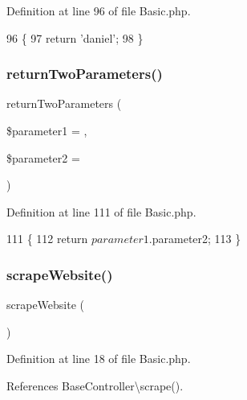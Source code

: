 Definition at line 96 of file Basic.\+php.


\begin{DoxyCode}
96                                    \{
97         \textcolor{keywordflow}{return} \textcolor{stringliteral}{'daniel'};
98     \}
\end{DoxyCode}
\hypertarget{class_basic_a2ef87b96abcca966a41e34d077fcc38e}{}\label{class_basic_a2ef87b96abcca966a41e34d077fcc38e} 
\subsubsection{\texorpdfstring{return\+Two\+Parameters()}{returnTwoParameters()}}
{\footnotesize\ttfamily return\+Two\+Parameters (\begin{DoxyParamCaption}\item[{}]{\$parameter1 = {\ttfamily \textquotesingle{}\textquotesingle{}},  }\item[{}]{\$parameter2 = {\ttfamily \textquotesingle{}\textquotesingle{}} }\end{DoxyParamCaption})}



Definition at line 111 of file Basic.\+php.


\begin{DoxyCode}
111                                                                             \{
112         \textcolor{keywordflow}{return} $parameter1 . $parameter2;
113     \}
\end{DoxyCode}
\hypertarget{class_basic_a48ffe9a27b91ce968b2bcf5e0a9d4069}{}\label{class_basic_a48ffe9a27b91ce968b2bcf5e0a9d4069} 
\subsubsection{\texorpdfstring{scrape\+Website()}{scrapeWebsite()}}
{\footnotesize\ttfamily scrape\+Website (\begin{DoxyParamCaption}{ }\end{DoxyParamCaption})}



Definition at line 18 of file Basic.\+php.



References Base\+Controller\textbackslash{}scrape().


